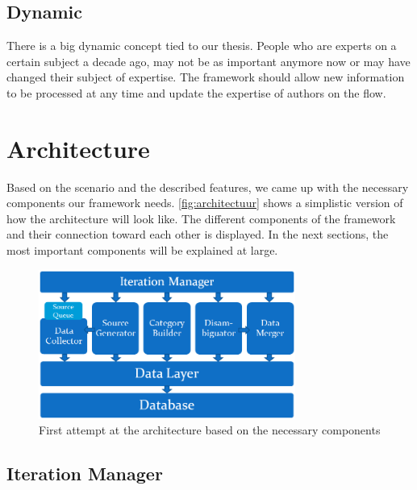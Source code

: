 \subsection{Dynamic}

There is a big dynamic concept tied to our thesis. People who are experts on a certain subject a decade ago, may not be as important anymore now or may have changed their subject of expertise. The framework should allow new information to be processed at any time and update the expertise of authors on the flow.

\section{Architecture}


Based on the scenario and the described features, we came up with the necessary components our framework needs. \autoref{fig:architectuur} shows a simplistic version of how the architecture will look like. The different components of the framework and their connection toward each other is displayed. In the next sections, the most important components will be explained at large.


\begin{figure}[htbp]
	\centering
		\includegraphics[width=0.75\textwidth]{fig/architectuur.png}
	\caption{First attempt at the architecture based on the necessary components}
	\label{fig:architectuur}
\end{figure}

\subsection{Iteration Manager}

